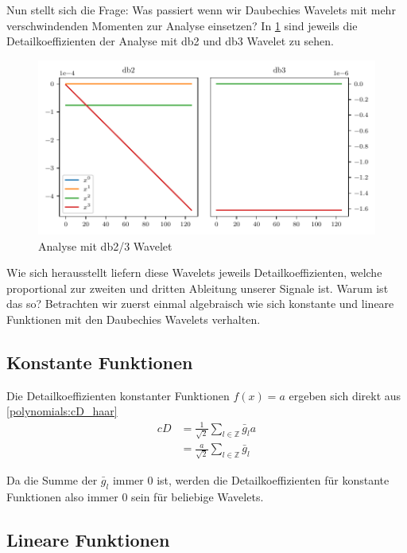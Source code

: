 \begin{refsection}
Nun stellt sich die Frage: Was passiert wenn wir Daubechies Wavelets mit mehr
verschwindenden Momenten zur Analyse einsetzen? In \cref{polynomials:db2_3}
sind jeweils die Detailkoeffizienten der Analyse mit db2 und db3 Wavelet zu
sehen.

\begin{figure}
    \centering
    \includegraphics{papers/polynomials/images/polynomials_signals_db2_3.pdf}
    \caption{Analyse mit db2/3 Wavelet\label{polynomials:db2_3}}
\end{figure}

Wie sich herausstellt liefern diese Wavelets jeweils Detailkoeffizienten,
welche proportional zur zweiten und dritten Ableitung unserer Signale ist.
Warum ist das so?
Betrachten wir zuerst einmal algebraisch wie sich konstante und lineare
Funktionen mit den Daubechies Wavelets verhalten.

\subsection{Konstante Funktionen}
Die Detailkoeffizienten konstanter Funktionen $f(x) = a$ ergeben sich direkt
aus \cref{polynomials:cD_haar}
\begin{align*}
    cD &= \frac{1}{\sqrt{2}} \sum_{l\in\mathbb Z} \bar{g}_l a \\
       &= \frac{a}{\sqrt{2}} \sum_{l\in\mathbb Z} \bar{g}_l
\end{align*}

Da die Summe der $\bar{g}_l$ immer 0 ist, werden die Detailkoeffizienten für
konstante Funktionen also immer 0 sein für beliebige Wavelets.

\subsection{Lineare Funktionen}


\end{refsection}
